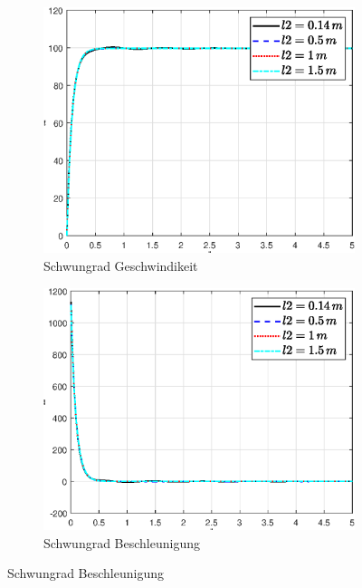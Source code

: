 \begin{figure}
    \captionsetup[subfigure]{justification=centering,font=footnotesize}
    \begin{subfigure}[b]{0.49\linewidth}
        \includegraphics[width=\linewidth]{plot_data/parameter/fig/l2/phi_punkt.eps}
        \caption{Schwungrad Geschwindikeit}
        \label{fig:l2_phi_punkt}
    \end{subfigure}
    \begin{subfigure}[b]{0.49 \linewidth}
        \includegraphics[width=\linewidth]{plot_data/parameter/fig/l2/phi_punkt_punkt.eps}
        \caption{Schwungrad Beschleunigung}

\end{subfigure}
\end{figure}
